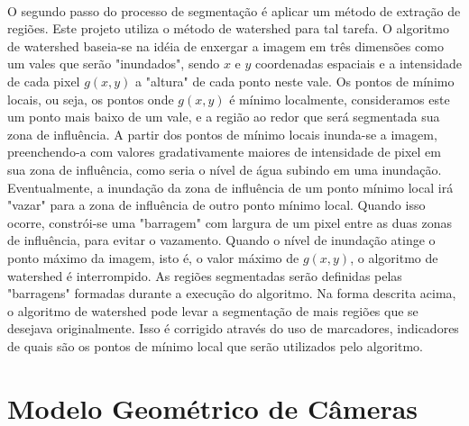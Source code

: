 \paragraph{}O segundo passo do processo de segmentação é aplicar um método de extração de regiões. Este projeto utiliza o método de watershed \cite{Gonzalez92} para tal tarefa. O algoritmo de watershed baseia-se na idéia de enxergar a imagem em três dimensões como um vales que serão "inundados", sendo \(x\) e \(y\) coordenadas espaciais e a intensidade de cada pixel \(g(x,y)\) a "altura" de cada ponto neste vale. Os pontos de mínimo locais, ou seja, os pontos onde \(g(x,y)\) é mínimo localmente, consideramos este um ponto mais baixo de um vale, e a região ao redor que será segmentada sua zona de influência. A partir dos pontos de mínimo locais inunda-se a imagem, preenchendo-a com valores gradativamente maiores de intensidade de pixel em sua zona de influência, como seria o nível de água subindo em uma inundação. Eventualmente, a inundação da zona de influência de um ponto mínimo local irá "vazar" para a zona de influência de outro ponto mínimo local. Quando isso ocorre, constrói-se uma "barragem" com largura de um pixel entre as duas zonas de influência, para evitar o vazamento. Quando o nível de inundação atinge o ponto máximo da imagem, isto é, o valor máximo de \(g(x,y)\), o algoritmo de watershed é interrompido. As regiões segmentadas serão definidas pelas "barragens" formadas durante a execução do algoritmo. Na forma descrita acima, o algoritmo de watershed pode levar a segmentação de mais regiões que se desejava originalmente. Isso é corrigido através do uso de marcadores, indicadores de quais são os pontos de mínimo local que serão utilizados pelo algoritmo.

\section{Modelo Geométrico de Câmeras}

